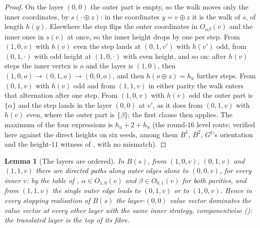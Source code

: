 \documentclass[11pt]{article}
\theoremstyle{plain}
\newtheorem{lemma}[theorem]{Lemma}
\theoremstyle{definition}
\begin{document}
\begin{proof}
On the layer $(0,0)$ the outer part is empty, so the walk moves only the
inner coordinates, by $s(\cdot\oplus z)$: in the coordinates $y=v\oplus z$
it is the walk of $s$, of length $h(y)$. Elsewhere the step flips the
outer coordinates in $O_{\alpha\beta}(v)$ and the inner ones in $s(v)$ at
once, so the inner height drops by one per step. From $(1,0,v)$ with
$h(v)$ even the step lands at $(0,1,v')$ with $h(v')$ odd, from
$(0,1,\cdot)$ with odd height at $(1,0,\cdot)$ with even height, and so
on: after $h(v)$ steps the inner vertex is $o$ and the layer is $(1,0)$,
then $(1,0,o)\to(0,1,o)\to(0,0,o)$, and then $h(o\oplus z)=h_u$ further
steps. From $(0,1,v)$ with $h(v)$ odd and from $(1,1,v)$ in either
parity the walk enters that alternation after one step. From $(1,0,v)$
with $h(v)$ odd the outer part is $\{\alpha\}$ and the step lands in the
layer $(0,0)$ at $v'$, as it does from $(0,1,v)$ with $h(v)$ even, where
the outer part is $\{\beta\}$; the first clause then applies. The maximum
of the four expressions is $h_u+2+h_u$ (the round-$16$ level route;
verified here against the direct heights on six seeds, among them
$B^{1}$, $B^{2}$, $G^{\sharp}$'s orientation and the height-$11$ witness
of , with no mismatch).
\end{proof}

\begin{lemma}[The layers are ordered]\label{lem:layer-order}
In $B(s)$, from $(1,0,v)$, $(0,1,v)$ and $(1,1,v)$ there are directed
paths along outer edges alone to $(0,0,v)$, for every inner $v$: by the
table of , $\alpha\in O_{1,0}(v)$ and
$\beta\in O_{0,1}(v)$ for both parities, and from $(1,1,v)$ the single
outer edge leads to $(0,1,v)$ or to $(1,0,v)$. Hence in every stopping
realisation of $B(s)$ the layer-$(0,0)$ value vector dominates the value
vector at every other layer with the same inner strategy, componentwise
(): the translated layer is the top of its fibre.
\end{lemma}
\end{document}
